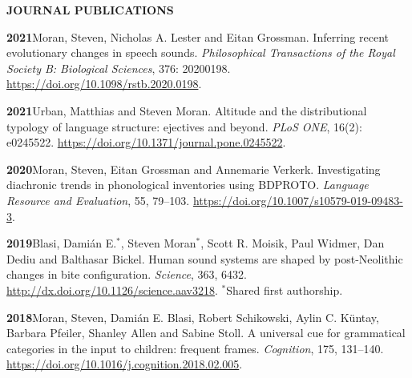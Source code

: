 \documentclass[11pt]{article}
\newcommand{\hangpara}{
 \setlength{\parindent}{0in} %
 \hangindent=0.42in %
}
\begin{document}
\clearpage
\begin{flushleft}
{\bf JOURNAL PUBLICATIONS}
\end{flushleft}


\hangpara
{\bf 2021}\hspace{1ex}Moran, Steven, Nicholas A. Lester and Eitan Grossman. Inferring recent evolutionary changes in speech sounds. \textit{Philosophical Transactions of the Royal Society B: Biological Sciences}, 376: 20200198. \url{https://doi.org/10.1098/rstb.2020.0198}.

\hangpara
\vskip 6pt
{\bf 2021}\hspace{1ex}Urban, Matthias and Steven Moran. Altitude and the distributional typology of language structure: ejectives and beyond. \textit{PLoS ONE}, 16(2): e0245522. \url{https://doi.org/10.1371/journal.pone.0245522}.


\hangpara
\vskip 6pt
{\bf 2020}\hspace{1ex}Moran, Steven, Eitan Grossman and Annemarie Verkerk. Investigating diachronic trends in phonological inventories using BDPROTO. \textit{Language Resource and Evaluation}, 55, 79--103. \url{https://doi.org/10.1007/s10579-019-09483-3}.

\hangpara
\vskip 6pt
{\bf 2019}\hspace{1ex}Blasi, Dami{\'a}n E.$^*$, Steven Moran$^*$, Scott R. Moisik, Paul Widmer, Dan Dediu and Balthasar Bickel. Human sound systems are shaped by post-Neolithic changes in bite configuration. \textit{Science}, 363, 6432. \url{http://dx.doi.org/10.1126/science.aav3218}. $^*$Shared first authorship. %

\hangpara
\vskip 6pt
{\bf 2018}\hspace{1ex}Moran, Steven, Dami{\'a}n E. Blasi, Robert Schikowski, Aylin C. K{\"u}ntay, Barbara Pfeiler, Shanley Allen and Sabine Stoll. A universal cue for grammatical categories in the input to children: frequent frames. \textit{Cognition}, 175, 131--140. \url{https://doi.org/10.1016/j.cognition.2018.02.005}. %
\end{document}
